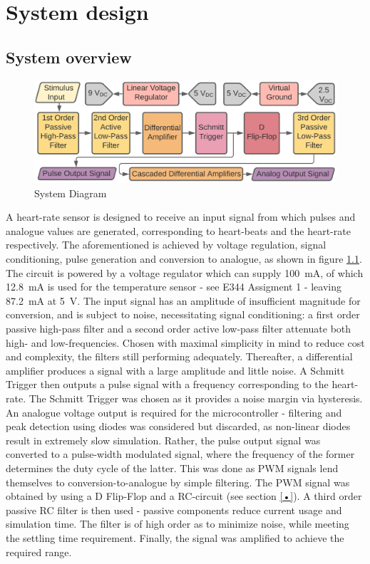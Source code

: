 
\chapter{System design}
\section{System overview} \label{sec:system}

\begin{figure}[h]
    \centering
    \vspace{-0.7cm}
    \includegraphics[width = 1\textwidth]{Figures/overview}
    \caption{System Diagram}
    \label{fig:overview}
\end{figure}

A heart-rate sensor is designed to receive an input signal from which pulses and analogue values are generated, corresponding to heart-beats and the heart-rate respectively. The aforementioned is achieved by voltage regulation, signal conditioning, pulse generation and conversion to analogue, as shown in figure \ref{fig:overview}. The circuit is powered by a voltage regulator \cite{ass1} which can supply \SI{100}{mA}, of which \SI{12.8}{mA} is used for the temperature sensor - see E344 Assigment 1 \cite{ass1} - leaving \SI{87.2}{mA} at \SI{5}{V}. The input signal has an amplitude of insufficient magnitude for conversion, and is subject to noise, necessitating signal conditioning: a first order passive high-pass filter and a second order active low-pass filter attenuate both high- and low-frequencies. Chosen with maximal simplicity in mind to reduce cost and complexity, the filters still performing adequately. Thereafter, a differential amplifier produces a signal with a large amplitude and little noise. A Schmitt Trigger then outputs a pulse signal with a frequency corresponding to the heart-rate. The Schmitt Trigger was chosen as it provides a noise margin via hysteresis. An analogue voltage output is required for the microcontroller - filtering and peak detection using diodes was considered but discarded, as non-linear diodes result in extremely slow simulation. Rather, the pulse output signal was converted to a pulse-width modulated signal, where the frequency of the former determines the duty cycle of the latter. This was done as PWM signals lend themselves to conversion-to-analogue by simple filtering. The PWM signal was obtained by using a D Flip-Flop and a RC-circuit (see section \ref{•}). A third order passive RC filter is then used - passive components reduce current usage and simulation time. The filter is of high order as to minimize noise, while meeting the settling time requirement. Finally, the signal was amplified to achieve the required range.